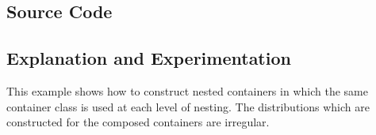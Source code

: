 \documentclass{report}
\begin{document}
\subsection{Source Code}



\subsection{Explanation and Experimentation}

This example shows how to construct nested containers in which the same
container class is used at each level of nesting.  
The distributions which are constructed for the composed containers
are irregular.

\end{document}
